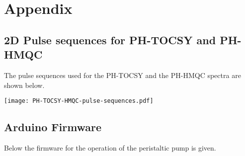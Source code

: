

\chapter{Appendix} \label{Chapter:Appendix}

\section{2D Pulse sequences for PH-TOCSY and PH-HMQC}

The pulse sequences used for the PH-TOCSY and the PH-HMQC spectra are shown below.

\begin{center}
  \texttt{[image: PH-TOCSY-HMQC-pulse-sequences.pdf]}
\end{center}



\section{Arduino Firmware}

Below the firmware for the operation of the peristaltic pump is given.

